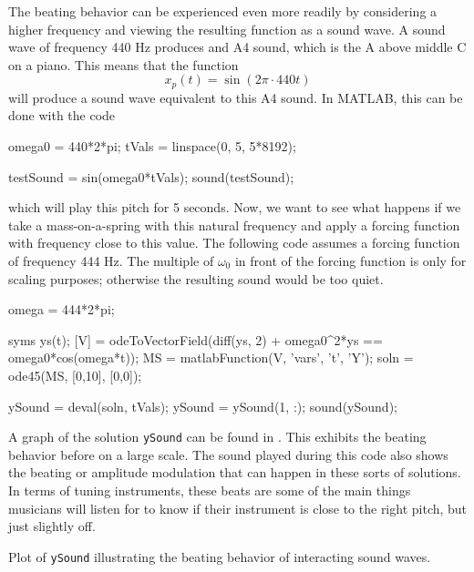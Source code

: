 The beating behavior can be experienced even more readily by considering a higher frequency and viewing the resulting function as a sound wave. A sound wave of frequency 440 Hz produces and A4 sound, which is the A above middle C on a piano. This means that the function
\begin{equation*}
x_p(t) = \sin(2\pi\cdot 440 t)
\end{equation*} will produce a sound wave equivalent to this A4 sound. In MATLAB, this can be done with the code
\begin{matlab}
omega0 = 440*2*pi;
tVals = linspace(0, 5, 5*8192);

testSound = sin(omega0*tVals);
sound(testSound);
\end{matlab}
\noindent which will play this pitch for 5 seconds. Now, we want to see what happens if we take a mass-on-a-spring with this natural frequency and apply a forcing function with frequency close to this value. The following code assumes a forcing function of frequency 444 Hz. The multiple of $\omega_0$ in front of the forcing function is only for scaling purposes; otherwise the resulting sound would be too quiet.

\begin{matlab}
omega = 444*2*pi;

syms ys(t);
[V] = odeToVectorField(diff(ys, 2) + omega0^2*ys == omega0*cos(omega*t));
MS = matlabFunction(V, 'vars', {'t', 'Y'});
soln = ode45(MS, [0,10], [0,0]);

ySound = deval(soln, tVals);
ySound = ySound(1, :);
sound(ySound);
\end{matlab}

A graph of the solution \texttt{ySound} can be found in . This exhibits the beating behavior before on a large scale. The sound played during this code also shows the beating or amplitude modulation that can happen in these sorts of solutions. In terms of tuning instruments, these beats are some of the main things musicians will listen for to know if their instrument is close to the right pitch, but just slightly off. 

\begin{myfig}
\capstart
{}
\caption{Plot of \texttt{ySound} illustrating the beating behavior of interacting sound waves. \label{beatplot:fig}}
\end{myfig}

